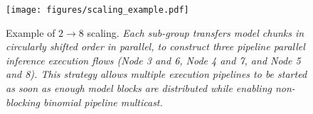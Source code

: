 \begin{figure}
    \centering
    \texttt{[image: figures/scaling\_example.pdf]}
    \vspace{-20pt}
    \caption{Example of $2 \rightarrow 8$ scaling.
    \textit{\textmd{Each sub-group transfers model chunks in circularly shifted order in parallel, to construct three pipeline parallel inference execution flows (Node 3 and 6, Node 4 and 7, and Node 5 and 8). This strategy allows multiple execution pipelines to be started as soon as enough model blocks are distributed while enabling non-blocking binomial pipeline multicast. 
    }}
    }
    \vspace{-5pt}
    \label{fig:scale_example}
\end{figure}

